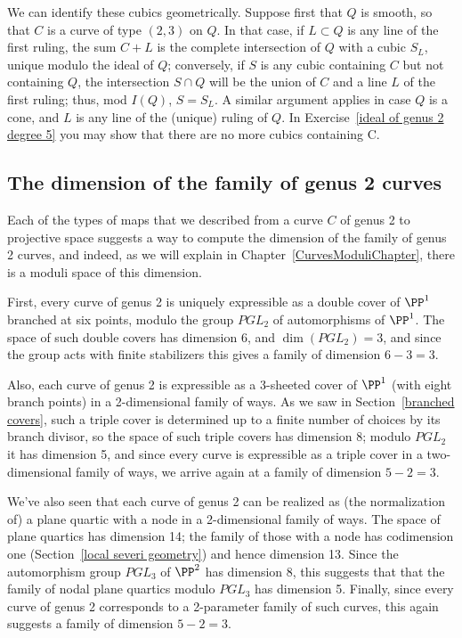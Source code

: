 We can identify these cubics geometrically. Suppose first that $Q$ is smooth, so that $C$ is a curve of type $(2,3)$ on $Q$. In that case, if $L \subset Q$ is any line of the first ruling, the sum $C+L$ is the complete intersection of $Q$ with a cubic $S_L$, unique modulo the ideal of $Q$; conversely, if $S$ is any cubic containing $C$ but not containing $Q$, the intersection $S \cap Q$ will be the union of $C$ and a line $L$ of the first ruling; thus, mod $I(Q)$, $S = S_L$. A similar argument applies in case $Q$ is a cone, and $L$ is any line of the (unique) ruling of $Q$. In Exercise~\ref{ideal of genus 2 degree 5} you may show that there are no more cubics containing C.

\subsection{The dimension of the family of genus 2 curves}

Each of the types of maps that we described from a curve $C$ of genus 2 to projective space suggests
a way to compute the dimension of the family of genus 2 curves, and indeed, as we will explain in Chapter~\ref{CurvesModuliChapter}, there is a moduli space of this dimension.

First,  every curve of genus 2 is uniquely expressible as a double cover of $\PP^1$ branched at six points, modulo the group $PGL_2$ of automorphisms of $\PP^1$. The space of such double covers has dimension 6, and $\dim(PGL_2) = 3$, and since the group acts with finite stabilizers this gives a family of dimension $6-3 = 3$.

Also, each curve  of genus 2 is expressible as a 3-sheeted cover of $\PP^1$ (with eight branch points) in a 2-dimensional family of ways. As we saw in Section~\ref{branched covers}, such a triple cover is determined up to a finite number of choices by its branch divisor, so the space of such triple covers has dimension 8; modulo $PGL_2$ it has dimension 5, and since every curve is expressible as a triple cover in a two-dimensional family of ways, we arrive again at a family of dimension $ 5-2 = 3$.

We've also seen that each curve of genus 2 can be realized as (the normalization of) a plane quartic  with a node in a 2-dimensional family of ways. The space of plane quartics has dimension 14; the family of those with a node has codimension one (Section~\ref{local severi geometry}) and hence dimension 13. Since  the automorphism group $PGL_3$ of $\PP^2$ has dimension 8, this suggests that that the family of nodal plane quartics modulo $PGL_3$ has dimension 5. Finally, since every curve of genus 2 corresponds to a 2-parameter family of such curves, this again suggests a family of dimension $ 5-2=3$.


